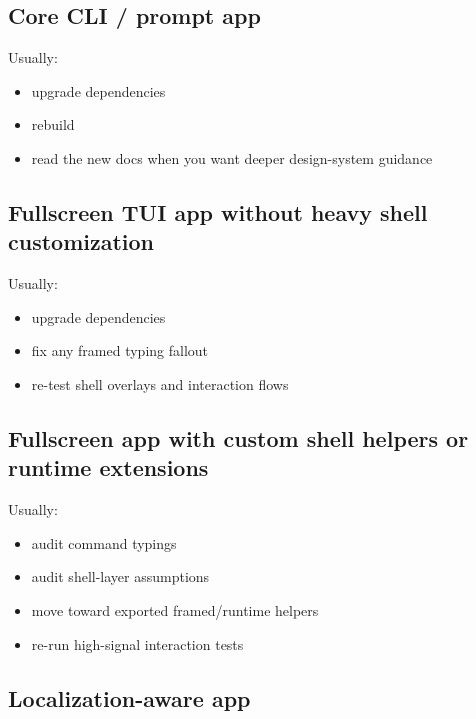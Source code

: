 \subsection{Core CLI / prompt app}\label{record-264-core-cli-prompt-app}

Usually:

\begin{itemize}
\tightlist
\item
  upgrade dependencies
\item
  rebuild
\item
  read the new docs when you want deeper design-system guidance
\end{itemize}

\subsection{Fullscreen TUI app without heavy shell customization}\label{record-264-fullscreen-tui-app-without-heavy-shell-customization}

Usually:

\begin{itemize}
\tightlist
\item
  upgrade dependencies
\item
  fix any framed typing fallout
\item
  re-test shell overlays and interaction flows
\end{itemize}

\subsection{Fullscreen app with custom shell helpers or runtime extensions}\label{record-264-fullscreen-app-with-custom-shell-helpers-or-runtime-extensions}

Usually:

\begin{itemize}
\tightlist
\item
  audit command typings
\item
  audit shell-layer assumptions
\item
  move toward exported framed/runtime helpers
\item
  re-run high-signal interaction tests
\end{itemize}

\subsection{Localization-aware app}\label{record-264-localization-aware-app}

